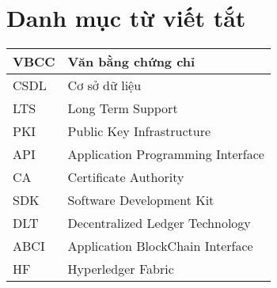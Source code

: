 \chapter*{Danh mục từ viết tắt}
\begin{center}
\renewcommand{\arraystretch}{1.5}
\begin{longtable}{ |l @{\qquad} |l| }
\hline
VBCC   & Văn bằng chứng chỉ  \\ \hline
CSDL   & Cơ sở dữ liệu  \\ \hline
LTS  &  Long Term Support  \\ \hline
PKI  &  Public Key Infrastructure \\ \hline
API    & Application Programming Interface  \\ \hline
CA    & Certificate Authority \\ \hline
SDK    & Software Development Kit \\ \hline
DLT & Decentralized Ledger Technology \\ \hline
ABCI & Application BlockChain Interface \\ \hline
HF & Hyperledger Fabric  \\ \hline
\end{longtable}
\end{center}
